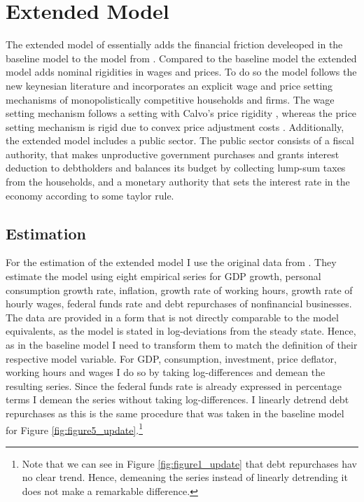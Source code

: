 \section{Extended Model}
\label{sec:extended_model}

The extended model of \textcite{jerman_macroeconomic_2012} essentially adds the
financial friction develeoped in the baseline model to the model from
\textcite{smets_shocks_2007}. Compared to the baseline model the extended model
adds nominal rigidities in wages and prices. To do so the model follows the new
keynesian literature and incorporates an explicit wage and price setting
mechanisms of monopolistically competitive households and firms. The wage
setting mechanism follows a setting with Calvo's price
rigidity \parencite{calvo_staggered_1983}, whereas the price setting mechanism
is rigid due to convex price adjustment
costs \parencite{rotemberg_sticky_1982}. Additionally, the extended model
includes a public sector. The public sector consists of a fiscal authority,
that makes unproductive government purchases and grants interest deduction to
debtholders and balances its budget by collecting lump-sum taxes from the
households, and a monetary authority that sets the interest rate in the economy
according to some taylor rule.

\subsection{Estimation}
\label{sec:estimation}

For the estimation of the extended model I use the original data from
\textcite{jerman_macroeconomic_2012}. They estimate the model using eight
empirical series for GDP growth, personal consumption growth rate, inflation,
growth rate of working hours, growth rate of hourly wages, federal funds rate
and debt repurchases of nonfinancial businesses. The data are provided in a
form that is not directly comparable to the model equivalents, as the model is
stated in log-deviations from the steady state. Hence, as in the baseline model
I need to transform them to match the definition of their respective model
variable. For GDP, consumption, investment, price deflator, working hours and
wages I do so by taking log-differences and demean the resulting series. Since
the federal funds rate is already expressed in percentage terms I demean the
series without taking log-differences. I linearly detrend debt repurchases as
this is the same procedure that was taken in the baseline model for Figure
\ref{fig:figure5_update}.\footnote{Note that we can see in Figure
  \ref{fig:figure1_update} that debt repurchases hav no clear trend. Hence,
  demeaning the series instead of linearly detrending it does not make a
  remarkable difference.}

